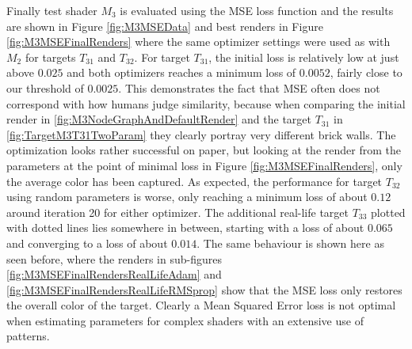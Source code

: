 Finally test shader $M_3$ is evaluated using the MSE loss function and the results are shown in Figure \ref{fig:M3MSEData} and best renders in Figure \ref{fig:M3MSEFinalRenders} where the same optimizer settings were used as with $M_2$ for targets $T_{31}$ and $T_{32}$. For target $T_{31}$, the initial loss is relatively low at just above $0.025$ and both optimizers reaches a minimum loss of $0.0052$, fairly close to our threshold of $0.0025$. This demonstrates the fact that MSE often does not correspond with how humans judge similarity, because when comparing the initial render in \ref{fig:M3NodeGraphAndDefaultRender} and the target $T_{31}$ in \ref{fig:TargetM3T31TwoParam} they clearly portray very different brick walls. The optimization looks rather successful on paper, but looking at the render from the parameters at the point of minimal loss in Figure \ref{fig:M3MSEFinalRenders}, only the average color has been captured. As expected, the performance for target $T_{32}$ using random parameters is worse, only reaching a minimum loss of about $0.12$ around iteration 20 for either optimizer. The additional real-life target $T_{33}$ plotted with dotted lines lies somewhere in between, starting with a loss of about $0.065$ and converging to a loss of about $0.014$. The same behaviour is shown here as seen before, where the renders in sub-figures \ref{fig:M3MSEFinalRendersRealLifeAdam} and \ref{fig:M3MSEFinalRendersRealLifeRMSprop} show that the MSE loss only restores the overall color of the target. Clearly a Mean Squared Error loss is not optimal when estimating parameters for complex shaders with an extensive use of patterns.  
